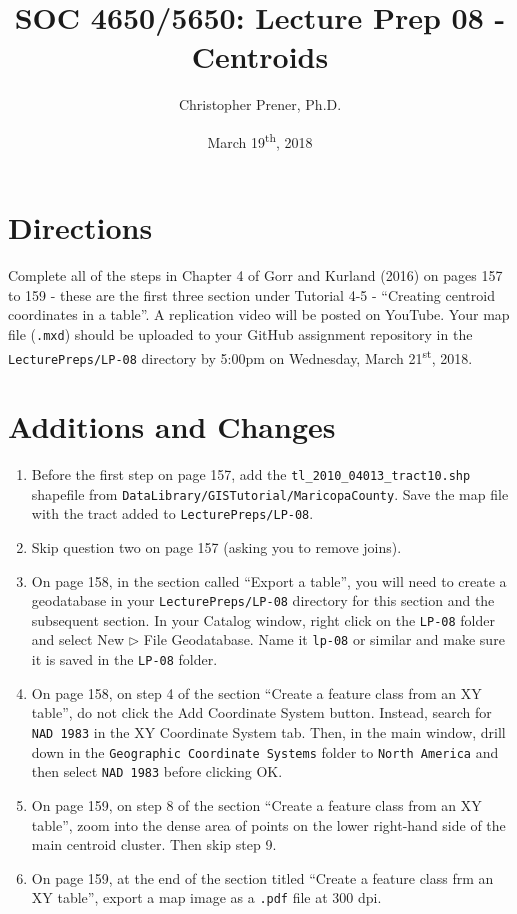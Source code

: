 \documentclass{tufte-handout}
\title{SOC 4650/5650: Lecture Prep 08 - Centroids}
\author{Christopher Prener, Ph.D.}
\date{March 19\textsuperscript{th}, 2018}
\begin{document}
\maketitle %

\section{Directions}
Complete all of the steps in Chapter 4 of Gorr and Kurland (2016) on pages 157 to 159 - these are the first three section under Tutorial 4-5 - ``Creating centroid coordinates in a table''. A replication video will be posted on YouTube. Your map file (\texttt{.mxd}) should be uploaded to your GitHub assignment repository in the \texttt{LecturePreps/LP-08} directory by 5:00pm on Wednesday, March 21\textsuperscript{st}, 2018.

\vspace{5mm}
\section{Additions and Changes}
\begin{enumerate}
\item Before the first step on page 157, add the \texttt{tl\_2010\_04013\_tract10.shp} shapefile from \texttt{DataLibrary/GISTutorial/MaricopaCounty}. Save the map file with the tract added to \texttt{LecturePreps/LP-08}.
\item Skip question two on page 157 (asking you to remove joins).
\item On page 158, in the section called ``Export a table'', you will need to create a geodatabase in your \texttt{LecturePreps/LP-08} directory for this section and the subsequent section. In your \textsf{Catalog window}, \textsf{right click} on the \texttt{LP-08} folder and select \textsf{New $\triangleright$ File Geodatabase}. Name it \texttt{lp-08} or similar and make sure it is saved in the \texttt{LP-08} folder.
\item On page 158, on step 4 of the section ``Create a feature class from an XY table'', do not click the \textsf{Add Coordinate System button}. Instead, search for \texttt{NAD 1983} in the \textsf{XY Coordinate System} tab. Then, in the main window, drill down in the \texttt{Geographic Coordinate Systems} folder to \texttt{North America} and then select \texttt{NAD 1983} before clicking \textsf{OK}.
\item On page 159, on step 8 of the section ``Create a feature class from an XY table'', zoom into the dense area of points on the lower right-hand side of the main centroid cluster. Then skip step 9.
\item On page 159, at the end of the section titled ``Create a feature class frm an XY table'', export a map image as a \texttt{.pdf} file at 300 dpi.
\end{enumerate}

\end{document}
